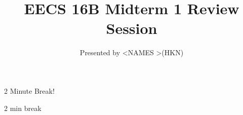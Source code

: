 

\title{EECS 16B Midterm 1 Review Session}
\author{Presented by \textless NAMES \textgreater (HKN)}
\date{}

\newcommand{\SlideAccessingLogistics}{@\#}










\begin{frame}
    2 Minute Break!
\end{frame}



	\begin{frame}
	    2 min break
	\end{frame}







